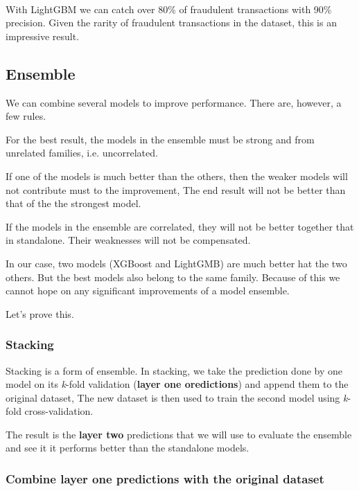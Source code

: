 \documentclass[11pt]{article}
\begin{document}
    \begin{center}
    \end{center}
    { \hspace*{\fill} \\}
    
    With LightGBM we can catch over 80\% of fraudulent transactions with
90\% precision. Given the rarity of fraudulent transactions in the
dataset, this is an impressive result.

    \subsection{Ensemble}\label{ensemble}

We can combine several models to improve performance. There are,
however, a few rules.

For the best result, the models in the ensemble must be strong and from
unrelated families, i.e. uncorrelated.

If one of the models is much better than the others, then the weaker
models will not contribute must to the improvement, The end result will
not be better than that of the the strongest model.

If the models in the ensemble are correlated, they will not be better
together that in standalone. Their weaknesses will not be compensated.

In our case, two models (XGBoost and LightGMB) are much better hat the
two others. But the best models also belong to the same family. Because
of this we cannot hope on any significant improvements of a model
ensemble.

Let's prove this.

\subsubsection{Stacking}\label{stacking}

Stacking is a form of ensemble. In stacking, we take the prediction done
by one model on its \emph{k}-fold validation (\textbf{layer one
oredictions}) and append them to the original dataset, The new dataset
is then used to train the second model using \emph{k}-fold
cross-validation.

The result is the \textbf{layer two} predictions that we will use to
evaluate the ensemble and see it it performs better than the standalone
models.

\subsubsection{Combine layer one predictions with the original
dataset}\label{combine-layer-one-predictions-with-the-original-dataset}
\end{document}
